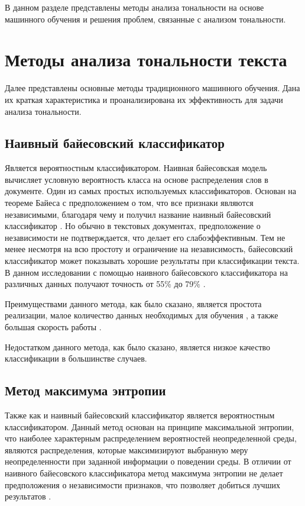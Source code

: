 \documentclass[a4paper,14pt, unknownkeysallowed]{extreport}
\begin{document}
В данном разделе представлены методы анализа тональности на основе машинного обучения и решения проблем, связанные с анализом тональности.

\section{Методы анализа тональности текста}

Далее представлены основные методы традиционного машинного обучения. Дана их краткая характеристика и проанализирована их эффективность для задачи анализа тональности. 

	\subsection{Наивный байесовский классификатор}
	
	Является вероятностным классификатором. Наивная байесовская модель вычисляет условную вероятность класса на основе распределения слов в документе. Один из самых простых используемых классификаторов. Основан на теореме Байеса с предположением о том, что все признаки являются независимыми, благодаря чему и получил название наивный байесовский классификатор \cite{Samigulin}. Но обычно в текстовых документах, предположение о независимости не подтверждается, что делает его слабоэффективным. Тем не менее несмотря на всю простоту и ограничение на независимость, байесовский классификатор может показывать хорошие результаты при классификации текста. В данном исследовании с помощью наивного байесовского классификатора на различных данных получают точность от 55\% до 79\% \cite{Hasan}.
	
	Преимуществами данного метода, как было сказано, является простота реализации, малое количество данных необходимых для
	обучения \cite{Samigulin}, а также большая скорость работы \cite{Noskov}.
	
	Недостатком данного метода, как было сказано, является низкое качество классификации в большинстве случаев.
	
	\subsection{Метод максимума энтропии}
	
	Также как и наивный байесовский классификатор является вероятностным классификатором. Данный метод основан на принципе максимальной энтропии, что наиболее характерным распределением вероятностей неопределенной среды, являются распределения, которые максимизируют выбранную меру неопределенности при заданной информации о поведении среды. В отличии от наивного байесовского классификатора метод максимума энтропии не делает предположения о независимости признаков, что позволяет добиться лучших результатов \cite{Samigulin}. 
	
\end{document}
